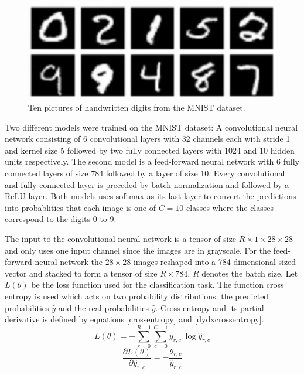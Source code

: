 \documentclass[a4paper, twoside]{article}
\newcommand*{\pd}[2]{\ensuremath{\dfrac{\partial #1}{\partial #2}}}
\begin{document}
\begin{figure}[h]
	\centering
  		\includegraphics[scale=1]{mnist.png}
  	\caption{Ten pictures of handwritten digits from the MNIST dataset. \cite{MNIST}} \label{figMNIST}
\end{figure}

Two different models were trained on the MNIST dataset: A convolutional neural network consisting of 6 convolutional layers with 32 channels each with stride 1 and kernel size 5 followed by two fully connected layers with 1024 and 10 hidden units respectively. The second model is a feed-forward neural network with 6 fully connected layers of size 784 followed by a layer of size 10. Every convolutional and fully connected layer is preceded by batch normalization and followed by a ReLU layer. Both models uses softmax as its last layer to convert the predictions into probablities that each image is one of $C=10$ classes where the classes correspond to the digits 0 to 9. \cite{cs231n}

The input to the convolutional neural network is a tensor of size $R \times 1 \times 28 \times 28$ and only uses one input channel since the images are in grayscale. For the feed-forward neural network the $28 \times 28$ images reshaped into a 784-dimensional sized vector and stacked to form a tensor of size $R \times 784$. $R$ denotes the batch size. Let $L(\theta)$ be the loss function used for the classification task. The function cross entropy is used which acts on two probability distributions: the predicted probabilities $\hat{y}$ and the real probabilities $\hat{y}$. Cross entropy and its partial derivative is defined by equations \eqref{crossentropy} and \eqref{dydxcrossentropy}. \cite{cs231n} \cite{notesonbackprop}
\begin{equation}\label{crossentropy}
L(\theta) = - \sum^{R-1}_{r=0} \sum^{C-1}_{c=0}y_{r,c} \ \log{\hat{y}_{r,c}}
\end{equation}
\begin{equation}\label{dydxcrossentropy}
\pd{L(\theta)}{\hat{y}_{r,c}} = - \frac{y_{r,c}}{\hat{y}_{r,c}}
\end{equation}
\end{document}
